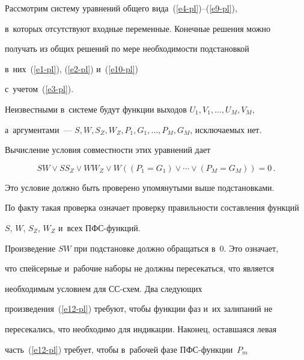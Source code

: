    


   Рассмотрим систему уравнений общего вида~(\ref{e4-pl})--(\ref{e9-pl}), 


в~которых отсутствуют входные переменные. Конечные решения можно 


получать из общих решений по мере необходимости подстановкой 


в~них~(\ref{e1-pl}), (\ref{e2-pl}) и~(\ref{e10-pl})  


с~учетом~(\ref{e3-pl}).


   


   Неизвестными в~системе будут функции выходов $U_1, V_1,\ldots, U_M,V_M$, 


а~аргументами~--- $S, W, S_Z, W_Z, P_1, G_1,\ldots, P_M, G_M$, исключаемых нет.


   


   Вычисление условия совместности этих уравнений дает


     \begin{equation}


   S W \vee S S_Z \vee W W_Z \vee W \left((P_1 = G_1) \vee \cdots \vee (P_M = 


G_M)\right) = 0\,.  


   \label{e12-pl}


   \end{equation}


   


   Это условие должно быть проверено упомянутыми выше подстановками. 


По факту такая проверка означает проверку правильности составления функций 


$S$, $W$, $S_Z$, $W_Z$ и~всех ПФС-функ\-ций.


   


   Произведение $SW$ при подстановке должно обращаться в~0. Это означает, 


что спейсерные и~рабочие наборы не должны пересекаться, что является 


необходимым условием для СС-схем. Два следующих  


произведения~(\ref{e12-pl}) требуют, чтобы функции фаз и~их залипаний не 


пересекались, что необходимо для индикации. Наконец, оставшаяся левая 


часть~(\ref{e12-pl}) требует, чтобы в~рабочей фазе ПФС-функ\-ции~$P_m$ 



